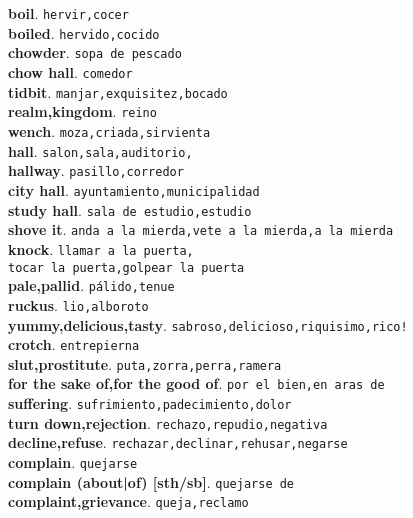 \documentclass[twocolumn]{article}
\begin{document}
	\textsf{\textbf{boil}}. \texttt{hervir,cocer}\\
	\textsf{\textbf{boiled}}. \texttt{hervido,cocido}\\
	\textsf{\textbf{chowder}}. \texttt{sopa de pescado}\\
	\textsf{\textbf{chow hall}}. \texttt{comedor}\\
	\textsf{\textbf{tidbit}}. \texttt{manjar,exquisitez,bocado}\\
	\textsf{\textbf{realm,kingdom}}. \texttt{reino}\\
	\textsf{\textbf{wench}}. \texttt{moza,criada,sirvienta}\\
	\textsf{\textbf{hall}}. \texttt{salon,sala,auditorio,}\\
	\textsf{\textbf{hallway}}. \texttt{pasillo,corredor}\\
	\textsf{\textbf{city hall}}. \texttt{ayuntamiento,municipalidad}\\
	\textsf{\textbf{study hall}}. \texttt{sala de estudio,estudio}\\
	\textsf{\textbf{shove it}}. \texttt{anda a la mierda,vete a la mierda,a la mierda}\\
	\textsf{\textbf{knock}}. \texttt{llamar a la puerta,\\tocar la puerta,golpear la puerta}\\
  \textsf{\textbf{pale,pallid}}. \texttt{p\'alido,tenue}\\
  \textsf{\textbf{ruckus}}. \texttt{lio,alboroto}\\
  \textsf{\textbf{yummy,delicious,tasty}}. \texttt{sabroso,delicioso,riquisimo,rico!}\\
  \textsf{\textbf{crotch}}. \texttt{entrepierna}\\
  \textsf{\textbf{slut,prostitute}}. \texttt{puta,zorra,perra,ramera}\\
  \textsf{\textbf{for the sake of,for the good of}}. \texttt{por el bien,en aras de}\\
  \textsf{\textbf{suffering}}. \texttt{sufrimiento,padecimiento,dolor}\\
  \textsf{\textbf{turn down,rejection}}. \texttt{rechazo,repudio,negativa}\\
  \textsf{\textbf{decline,refuse}}. \texttt{rechazar,declinar,rehusar,negarse}\\
  \textsf{\textbf{complain}}. \texttt{quejarse}\\
  \textsf{\textbf{complain (about|of) [sth/sb]}}. \texttt{quejarse de}\\
  \textsf{\textbf{complaint,grievance}}. \texttt{queja,reclamo}\\
\end{document}
